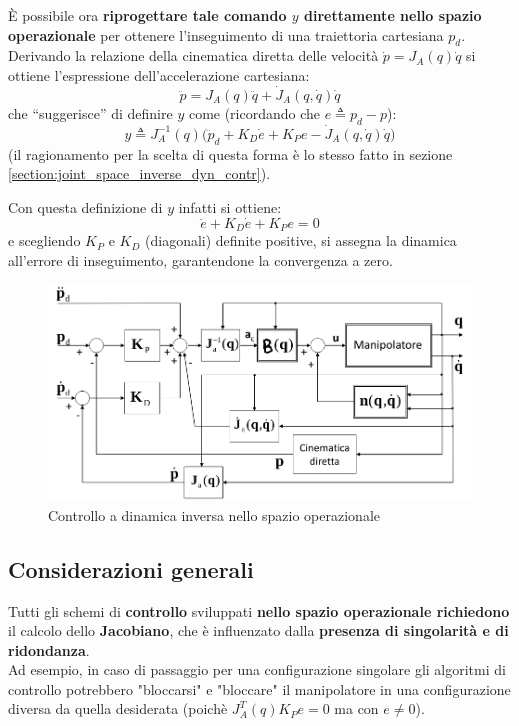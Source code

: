 È possibile ora \textbf{riprogettare tale comando $y$ direttamente nello spazio operazionale} per ottenere l’inseguimento di una traiettoria cartesiana $p_d$.
Derivando la relazione della cinematica diretta delle velocità $\dot{p} = J_A(q)\dot{q}$ si ottiene l’espressione dell’accelerazione cartesiana:
$$
\ddot{p} = J_A(q)\ddot{q} + \dot{J}_A(q, \dot{q})\dot{q}
$$
che “suggerisce” di definire $y$ come (ricordando che $e \triangleq p_d - p$):
$$
y \triangleq J_{A}^{-1}(q)\bigl(\ddot{p}_{d}+K_{D}\dot{e}+K_{P}e-\dot{J}_{A}(q,\dot{q})\dot{q}\bigr)
$$
(il ragionamento per la scelta di questa forma è lo stesso fatto in sezione \ref{section:joint_space_inverse_dyn_contr}).

Con questa definizione di $y$ infatti si ottiene:
$$
\ddot{e} + K_D\dot{e} + K_Pe = 0
$$
e scegliendo $K_P$ e $K_D$ (diagonali) definite positive, si assegna la dinamica all’errore di inseguimento, garantendone la convergenza a zero.

\begin{figure}[H]
	\centering
	\includegraphics[width=0.7\linewidth]{images/inverse_dyn_control_oper_space}
	\caption{Controllo a dinamica inversa nello spazio operazionale}
	\label{fig:inversedyncontroloperspace}
\end{figure}
\unboldmath




\subsection{Considerazioni generali}
Tutti gli schemi di \textbf{controllo} sviluppati \textbf{nello spazio operazionale richiedono} il calcolo dello \textbf{Jacobiano}, che è influenzato dalla \textbf{presenza di singolarità e di ridondanza}.\\
Ad esempio, in caso di passaggio per una configurazione singolare gli algoritmi di controllo potrebbero "bloccarsi" e "bloccare" il manipolatore in una configurazione diversa da quella desiderata (poichè $J_A^T(q)K_Pe=0$ ma con $e \neq 0$).

